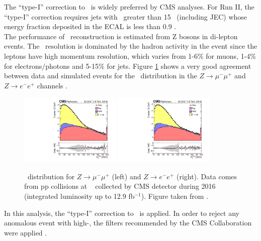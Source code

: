 \noindent The ``type-I'' correction to \METv~is widely preferred by CMS analyses. For Run II, 
the ``type-I'' correction requires jets with \pt~greater than 15 \GeV~(including JEC) whose  
energy fraction deposited in the ECAL is less than 0.9 \cite{METPerformance2}. \\

\noindent The performance of \MET  ~reconstruction is estimated from Z bosons
in di-lepton events. The \MET~resolution is dominated by the hadron activity 
in the event since the leptons have high momentum resolution, which varies 
from 1-6$\%$ for muons, 1-4$\%$ for electrons$/$photons and 5-15$\%$ for 
jets. Figure \ref{fig:MetPerfomance} shows a very good agreement between data and 
simulated events for the \MET~distribution in the $Z\rightarrow \mu^{-}\mu^{+}$ 
and $Z\rightarrow e^{-}e^{+}$ channels \cite{METPerformance2}.\\
 
\begin{figure}[ht]
  \begin{center}
    \includegraphics[width=0.43\textwidth]{figuras/Chapter3/METPerformancemumu.pdf}
    \includegraphics[width=0.43\textwidth]{figuras/Chapter3/METPerformanceee.pdf}
    \caption{\MET~distribution for $Z\rightarrow \mu^{-}\mu^{+}$ (left) and $Z\rightarrow e^{-}e^{+}$ (right). Data comes 
    from pp collisions at  \TeV~ collected by CMS detector during 2016 (integrated luminosity up to 12.9 fb$^{-1}$).
    Figure taken from \cite{METPerformance2}.}
    \label{fig:MetPerfomance}
  \end{center}
\end{figure} 

\noindent In this analysis, the ``type-I'' correction to \METv~is applied. In order to reject 
any anomalous event with high-\MET, the filters recommended by the CMS Collaboration
were applied \cite{METPOG}. 

